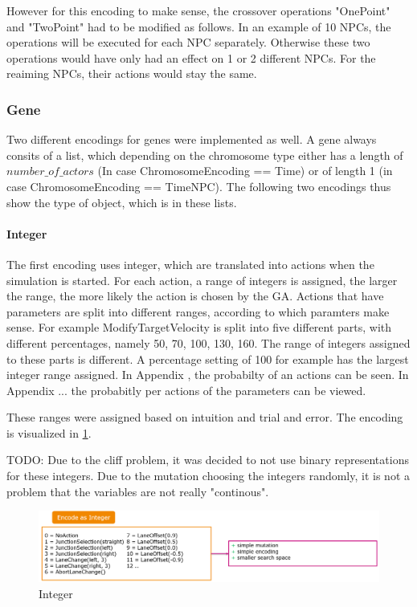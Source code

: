However for this encoding to make sense, the crossover operations "OnePoint" and "TwoPoint" had to be modified as follows. In an example of 10 NPCs, the operations will be executed for each NPC separately. Otherwise these two operations would have only had an effect on 1 or 2 different NPCs. For the reaiming NPCs, their actions would stay the same.

\subsubsection{Gene}
Two different encodings for genes were implemented as well. A gene always consits of a list, which depending on the chromosome type either has a length of $number\_of\_actors$ (In case ChromosomeEncoding == Time) or of length 1 (in case ChromosomeEncoding == TimeNPC). The following two encodings thus show the type of object, which is in these lists.

\paragraph{Integer}
The first encoding uses integer, which are translated into actions when the simulation is started. For each action, a range of integers is assigned, the larger the range, the more likely the action is chosen by the GA. Actions that have parameters are split into different ranges, according to which paramters make sense. For example ModifyTargetVelocity is split into five different parts, with different percentages, namely 50, 70, 100, 130, 160. The range of integers assigned to these parts is different. A percentage setting of 100 for example has the largest integer range assigned.
In Appendix , the probabilty of an actions can be seen. In Appendix ... the probabitly per actions of the parameters can be viewed.

These ranges were assigned based on intuition and trial and error. The encoding is visualized in \ref{figure:encoding:gene:int}.

TODO: Due to the cliff problem, it was decided to not use binary representations for these integers. Due to the mutation choosing the integers randomly, it is not a problem that the variables are not really "continous".

\begin{figure}[ht] 
	\includegraphics[width=1\linewidth]{figures/int_encoding}
	\caption{Integer}
	\label{figure:encoding:gene:int}
\end{figure}

